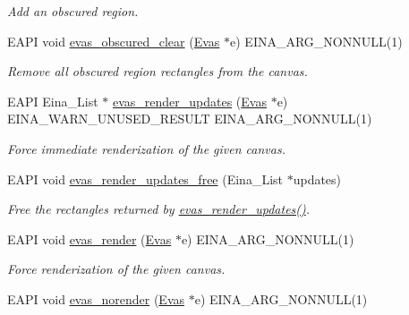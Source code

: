\begin{DoxyCompactItemize}
\begin{DoxyCompactList}\small\item\em Add an obscured region. \item\end{DoxyCompactList}\item 
EAPI void \hyperlink{group__Evas__Canvas_ga76dbc1ce160666ffde45901346cfe876}{evas\_\-obscured\_\-clear} (\hyperlink{group__Evas__Canvas_ga5ff87cc4ce6bc43e3b640a6d37f73043}{Evas} $\ast$e) EINA\_\-ARG\_\-NONNULL(1)
\begin{DoxyCompactList}\small\item\em Remove all obscured region rectangles from the canvas. \item\end{DoxyCompactList}\item 
EAPI Eina\_\-List $\ast$ \hyperlink{group__Evas__Canvas_ga49650dcc731a151d4881106b56f7a5ca}{evas\_\-render\_\-updates} (\hyperlink{group__Evas__Canvas_ga5ff87cc4ce6bc43e3b640a6d37f73043}{Evas} $\ast$e) EINA\_\-WARN\_\-UNUSED\_\-RESULT EINA\_\-ARG\_\-NONNULL(1)
\begin{DoxyCompactList}\small\item\em Force immediate renderization of the given canvas. \item\end{DoxyCompactList}\item 
EAPI void \hyperlink{group__Evas__Canvas_gae4889bb5ec0e6e4f6ce5d6ef99f8737b}{evas\_\-render\_\-updates\_\-free} (Eina\_\-List $\ast$updates)
\begin{DoxyCompactList}\small\item\em Free the rectangles returned by \hyperlink{group__Evas__Canvas_ga49650dcc731a151d4881106b56f7a5ca}{evas\_\-render\_\-updates()}. \item\end{DoxyCompactList}\item 
EAPI void \hyperlink{group__Evas__Canvas_ga241869ebb085b8ab11ff6af26e1aeaaf}{evas\_\-render} (\hyperlink{group__Evas__Canvas_ga5ff87cc4ce6bc43e3b640a6d37f73043}{Evas} $\ast$e) EINA\_\-ARG\_\-NONNULL(1)
\begin{DoxyCompactList}\small\item\em Force renderization of the given canvas. \item\end{DoxyCompactList}\item 
EAPI void \hyperlink{group__Evas__Canvas_ga5c7761185381376e2d97497625a7bbe1}{evas\_\-norender} (\hyperlink{group__Evas__Canvas_ga5ff87cc4ce6bc43e3b640a6d37f73043}{Evas} $\ast$e) EINA\_\-ARG\_\-NONNULL(1)

\end{DoxyCompactItemize}
